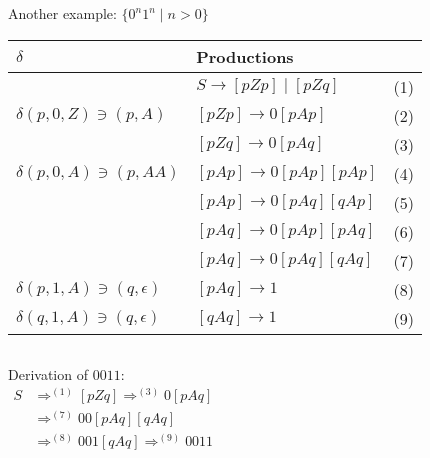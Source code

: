 \documentclass[handout]{beamer}
\begin{document}
\begin{frame}{Another example: $\{0^n1^n\mid n>0\}$}

    \vspace{-6pt}
    {\small    
        \begin{center}
            \begin{tabular}{l l c}
                $\delta$ & Productions & \\\hline
                & $S\rightarrow [pZp]\mid [pZq]$ & (1)\\
                $\delta(p,0,Z)\ni (p,A)$	& $[pZp]\rightarrow 0[pAp] $ & (2)\\
                & $[pZq]\rightarrow 0[pAq] $& (3)\\
                $\delta(p,0,A)\ni (p,AA)$ & $[pAp]\rightarrow 0[pAp][pAp]$ & (4)\\
                & $[pAp]\rightarrow 0[pAq][qAp] $ & (5)\\
                & $[pAq]\rightarrow 0[pAp][pAq] $ & (6)\\
                & $[pAq]\rightarrow 0[pAq][qAq] $ & (7)\\
                $\delta(p,1,A)\ni (q,\epsilon)$ & $[pAq]\rightarrow 1$ & (8)\\			
                $\delta(q,1,A)\ni (q, \epsilon)$ & $[qAq]\rightarrow 1$ & (9)			
            \end{tabular}
        \end{center}
    }

    \bigskip

    \begin{columns}


        Derivation of $0011$:\vspace{-12pt}
        \begin{align*}
            S &\Rightarrow^{(1)} [pZq] \Rightarrow^{(3)} 0[pAq]\\
              &\Rightarrow^{(7)} 00[pAq][qAq]\\
              &\Rightarrow^{(8)} 001[qAq]\Rightarrow^{(9)} 0011   
        \end{align*}



\end{columns}
\end{frame}
\end{document}
